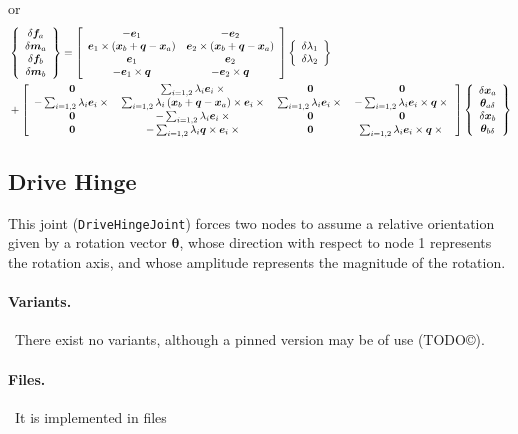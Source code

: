 \documentclass[10pt,dvips,fleqn,subeqn]{report}
\newcommand{\T}[1]{\bm{#1}}
\newcommand{\TT}[1]{\bm{#1}}
\begin{document}
or
\begin{align}
	&\cubr{\cvvect{
		\delta\T{f}_a
		\\
		\delta\T{m}_a
		\\
		\delta\T{f}_b
		\\
		\delta\T{m}_b
	}}
	=
	\sqbr{\matr{cc}{
		-\T{e}_1 & -\T{e}_2
		\\
		\T{e}_1 \times \plbr{\T{x}_b + \T{q} - \T{x}_a} & \T{e}_2 \times \plbr{\T{x}_b + \T{q} - \T{x}_a}
		\\
		\T{e}_1 & \T{e}_2
		\\
		-\T{e}_1 \times \T{q} & -\T{e}_2 \times \T{q}
	}} \cubr{\cvvect{
		\delta\lambda_1
		\\
		\delta\lambda_2
	}}
	\nonumber \\
	&\mbox{}+ \sqbr{\matr{cccc}{
		\TT{0} & \sum_{i=1,2} \lambda_i \T{e}_i\times{} & \TT{0} & \TT{0}
		\\
		-\sum_{i=1,2} \lambda_i \T{e}_i\times{}
			& \sum_{i=1,2} \lambda_i \plbr{\T{x}_b + \T{q} - \T{x}_a} \times \T{e}_i\times{}
			& \sum_{i=1,2} \lambda_i \T{e}_i\times{}
			& -\sum_{i=1,2} \lambda_i \T{e}_i\times\T{q}\times{}
		\\
		\TT{0} & -\sum_{i=1,2} \lambda_i \T{e}_i\times{} & \TT{0} & \TT{0}
		\\
		\TT{0}
			& -\sum_{i=1,2} \lambda_i \T{q}\times\T{e}_i\times{}
			& \TT{0}
			& \sum_{i=1,2} \lambda_i \T{e}_i\times\T{q}\times{}
	}} \cubr{\cvvect{
		\delta\T{x}_a
		\\
		\T{\theta}_{a\delta}
		\\
		\delta\T{x}_b
		\\
		\T{\theta}_{b\delta}
	}}
\end{align}


\subsection{Drive Hinge}
This joint (\texttt{DriveHingeJoint}) forces two nodes to assume a relative orientation
given by a rotation vector $\T{\theta}$, whose direction with respect
to node 1 represents the rotation axis, and whose amplitude represents 
the magnitude of the rotation.

\paragraph{Variants.} \
There exist no variants, although a pinned version may be of use (TODO\copyright).

\paragraph{Files.} \
It is implemented in files
\end{document}
